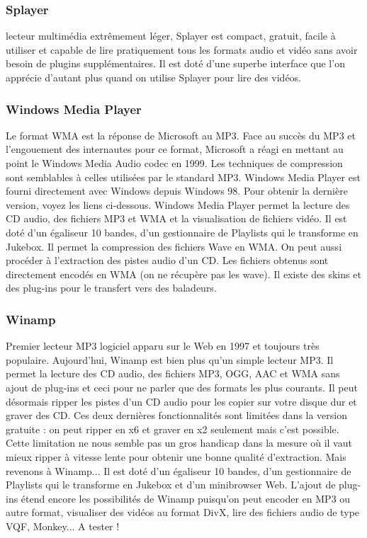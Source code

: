 \documentclass[12pt]{report}
\begin{document}
\subsubsection{Splayer}

lecteur multimédia extrêmement léger, Splayer est compact, gratuit, facile à utiliser et capable de lire pratiquement tous les formats audio et vidéo sans avoir besoin de plugins supplémentaires. Il est doté d'une superbe interface que l'on apprécie d'autant plus quand on utilise Splayer pour lire des vidéos. 

\subsubsection{Windows Media Player}

Le format WMA est la réponse de Microsoft au MP3. Face au succès du MP3 et l'engouement des internautes pour ce format, Microsoft a réagi en mettant au point le Windows Media Audio codec en 1999. Les techniques de compression sont semblables à celles utilisées par le standard MP3. Windows Media Player est fourni directement avec Windows depuis Windows 98. Pour obtenir la dernière version, voyez les liens ci-dessous. Windows Media Player permet la lecture des CD audio, des fichiers MP3 et WMA et la visualisation de fichiers vidéo. Il est doté d'un égaliseur 10 bandes, d'un gestionnaire de Playlists qui le transforme en Jukebox. Il permet la compression des fichiers Wave en WMA. On peut aussi procéder à l'extraction des pistes audio d'un CD. Les fichiers obtenus sont directement encodés en WMA (on ne récupère pas les wave). Il existe des skins et des plug-ins pour le transfert vers des baladeurs.

\subsubsection{Winamp}

Premier lecteur MP3 logiciel apparu sur le Web en 1997 et toujours très populaire. Aujourd'hui, Winamp est bien plus qu'un simple lecteur MP3. Il permet la lecture des CD audio, des fichiers MP3, OGG, AAC et WMA sans ajout de plug-ins et ceci pour ne parler que des formats les plus courants. Il peut désormais ripper les pistes d'un CD audio pour les copier sur votre disque dur et graver des CD. Ces deux dernières fonctionnalités sont limitées dans la version gratuite : on peut ripper en x6 et graver en x2 seulement mais c'est possible. Cette limitation ne nous semble pas un gros handicap dans la mesure o\`u il vaut mieux ripper \`a  vitesse lente pour obtenir une bonne qualité d'extraction. Mais revenons \`a  Winamp... Il est doté d'un égaliseur 10 bandes, d'un gestionnaire de Playlists qui le transforme en Jukebox et d'un minibrowser Web. 
L'ajout de plug-ins étend encore les possibilités de Winamp puisqu'on peut encoder en MP3 ou autre format, visualiser des vidéos au format DivX, lire des fichiers audio de type VQF, Monkey... A tester !
\end{document}
